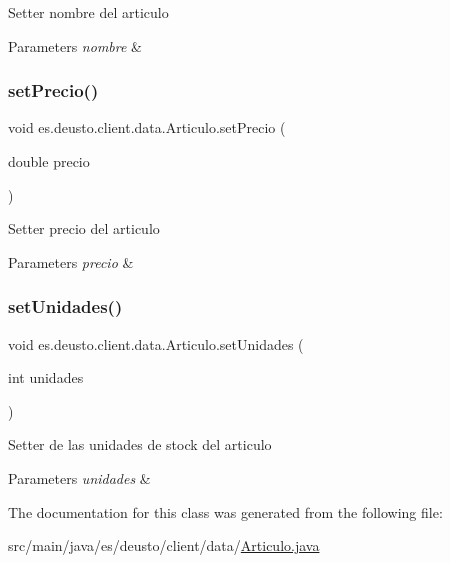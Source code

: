 Setter nombre del articulo 
\begin{DoxyParams}{Parameters}
{\em nombre} & \\
\hline
\end{DoxyParams}
\mbox{\label{classes_1_1deusto_1_1client_1_1data_1_1_articulo_a81f5428d34c4c3d6b0c3985245c7abea}} 
\subsubsection{\texorpdfstring{setPrecio()}{setPrecio()}}
{\footnotesize\ttfamily void es.\+deusto.\+client.\+data.\+Articulo.\+set\+Precio (\begin{DoxyParamCaption}\item[{double}]{precio }\end{DoxyParamCaption})}

Setter precio del articulo 
\begin{DoxyParams}{Parameters}
{\em precio} & \\
\hline
\end{DoxyParams}
\mbox{\label{classes_1_1deusto_1_1client_1_1data_1_1_articulo_a924d03bb907e8f1acde9e288a82124d6}} 
\subsubsection{\texorpdfstring{setUnidades()}{setUnidades()}}
{\footnotesize\ttfamily void es.\+deusto.\+client.\+data.\+Articulo.\+set\+Unidades (\begin{DoxyParamCaption}\item[{int}]{unidades }\end{DoxyParamCaption})}

Setter de las unidades de stock del articulo 
\begin{DoxyParams}{Parameters}
{\em unidades} & \\
\hline
\end{DoxyParams}


The documentation for this class was generated from the following file\+:\begin{DoxyCompactItemize}
\item 
src/main/java/es/deusto/client/data/\mbox{\hyperlink{_articulo_8java}{Articulo.\+java}}\end{DoxyCompactItemize}
